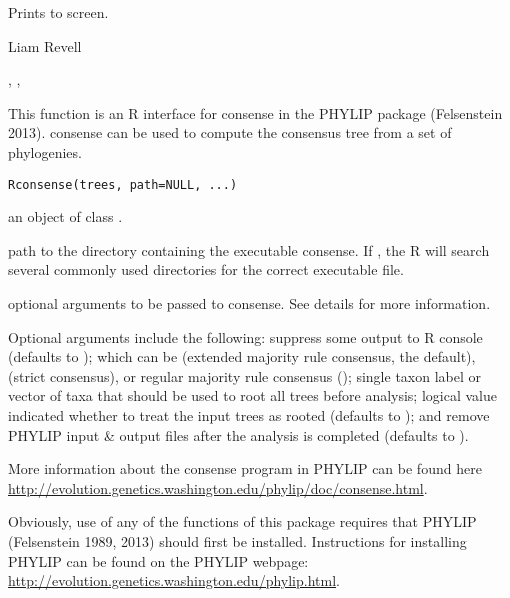 \documentclass[a4paper]{book}
\begin{document}
%
\begin{Value}
Prints to screen.
\end{Value}
%
\begin{Author}\relax
Liam Revell 
\end{Author}
%
\begin{SeeAlso}\relax
{}, , 
\end{SeeAlso}
%
\begin{Description}\relax
This function is an R interface for consense in the PHYLIP package (Felsenstein 2013). consense can be used to compute the consensus tree from a set of phylogenies. 
\end{Description}
%
\begin{Usage}
\begin{verbatim}
Rconsense(trees, path=NULL, ...)
\end{verbatim}
\end{Usage}
%
\begin{Arguments}
\begin{ldescription}
\item[\code{trees}] an object of class .
\item[\code{path}] path to the directory containing the executable consense. If , the R will search several commonly used directories for the correct executable file.
\item[\code{...}] optional arguments to be passed to consense. See details for more information.
\end{ldescription}
\end{Arguments}
%
\begin{Details}\relax
Optional arguments include the following:  suppress some output to R console (defaults to );  which can be  (extended majority rule consensus, the default),  (strict consensus), or regular majority rule consensus ();  single taxon label or vector of taxa that should be used to root all trees before analysis;  logical value indicated whether to treat the input trees as rooted (defaults to ); and  remove PHYLIP input \& output files after the analysis is completed (defaults to ).

More information about the consense program in PHYLIP can be found here \url{http://evolution.genetics.washington.edu/phylip/doc/consense.html}.

Obviously, use of any of the functions of this package requires that PHYLIP (Felsenstein 1989, 2013) should first be installed. Instructions for installing PHYLIP can be found on the PHYLIP webpage: \url{http://evolution.genetics.washington.edu/phylip.html}.
\end{Details}
\end{document}
